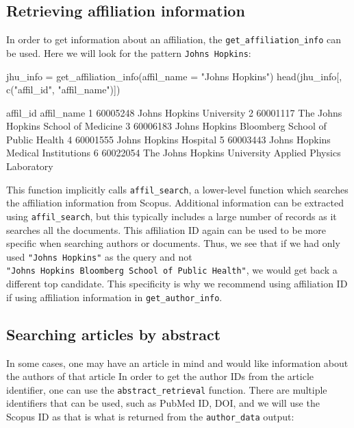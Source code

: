 \hypertarget{retrieving-affiliation-information}{%
\subsection{Retrieving affiliation
information}\label{retrieving-affiliation-information}}

In order to get information about an affiliation, the
\texttt{get\_affiliation\_info} can be used. Here we will look for the
pattern \texttt{Johns\ Hopkins}:

\begin{Schunk}
\begin{Sinput}
jhu_info = get_affiliation_info(affil_name = "Johns Hopkins")
head(jhu_info[, c("affil_id", "affil_name")])
\end{Sinput}
\begin{Soutput}
  affil_id                                              affil_name
1 60005248                                Johns Hopkins University
2 60001117                    The Johns Hopkins School of Medicine
3 60006183         Johns Hopkins Bloomberg School of Public Health
4 60001555                                  Johns Hopkins Hospital
5 60003443                      Johns Hopkins Medical Institutions
6 60022054 The Johns Hopkins University Applied Physics Laboratory
\end{Soutput}
\end{Schunk}

This function implicitly calls \texttt{affil\_search}, a lower-level
function which searches the affiliation information from Scopus.
Additional information can be extracted using \texttt{affil\_search},
but this typically includes a large number of records as it searches all
the documents. This affiliation ID again can be used to be more specific
when searching authors or documents. Thus, we see that if we had only
used \texttt{"Johns\ Hopkins"} as the query and not
\texttt{"Johns\ Hopkins\ Bloomberg\ School\ of\ Public\ Health"}, we
would get back a different top candidate. This specificity is why we
recommend using affiliation ID if using affiliation information in
\texttt{get\_author\_info}.

\hypertarget{searching-articles-by-abstract}{%
\subsection{Searching articles by
abstract}\label{searching-articles-by-abstract}}

In some cases, one may have an article in mind and would like
information about the authors of that article In order to get the author
IDs from the article identifier, one can use the
\texttt{abstract\_retrieval} function. There are multiple identifiers
that can be used, such as PubMed ID, DOI, and we will use the Scopus ID
as that is what is returned from the \texttt{author\_data} output:

